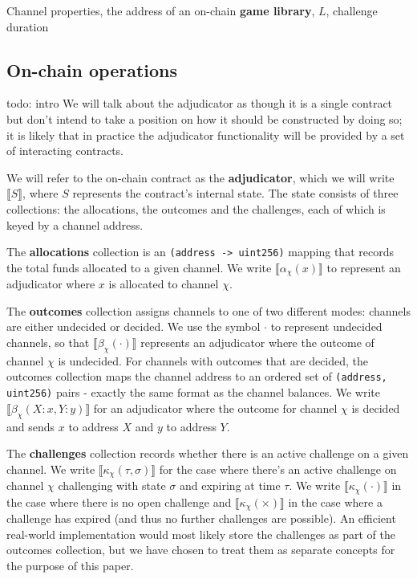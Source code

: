 \documentclass{article}
\theoremstyle{definition}
\newcommand{\adj}[1]{\llbracket #1 \rrbracket}
\begin{document}
Channel properties, the address of an on-chain \textbf{game library}, $L$,
challenge duration




\subsection{On-chain operations}

todo: intro
We will talk about the adjudicator as though it is a single contract but don't intend to take a position on how it should be constructed by doing so; it is likely that in practice the adjudicator functionality will be provided by a set of interacting contracts.

We will refer to the on-chain contract as the \textbf{adjudicator}, which we will write $\adj{S}$, where $S$ represents the contract's internal state. The state consists of three collections: the allocations, the outcomes and the challenges, each of which is keyed by a channel address. 

The \textbf{allocations} collection is an \texttt{(address -> uint256)} mapping that records the total funds allocated to a given channel. We write $\adj{\alpha_\chi(x)}$ to represent an adjudicator where $x$ is allocated to channel $\chi$.

The \textbf{outcomes} collection assigns channels to one of two different modes: channels are either undecided or decided. We use the symbol $\cdot$ to represent undecided channels, so that $\adj{\beta_\chi(\cdot)}$ represents an adjudicator where the outcome of channel $\chi$ is undecided. For channels with outcomes that are decided, the outcomes collection maps the channel address to an ordered set of \texttt{(address, uint256)} pairs - exactly the same format as the channel balances. We write $\adj{\beta_\chi(X: x, Y: y)}$ for an adjudicator where the outcome for channel $\chi$ is decided and sends $x$ to address $X$ and $y$ to address $Y$.

The \textbf{challenges} collection records whether there is an active challenge on a given channel. We write $\adj{\kappa_\chi(\tau, \sigma)}$ for the case where there's an active challenge on channel $\chi$ challenging with state $\sigma$ and expiring at time $\tau$. We write $\adj{\kappa_\chi(\cdot)}$ in the case where there is no open challenge and $\adj{\kappa_\chi(\times)}$ in the case where a challenge has expired (and thus no further challenges are possible). An efficient real-world implementation would most likely store the challenges as part of the outcomes collection, but we have chosen to treat them as separate concepts for the purpose of this paper.
\end{document}
